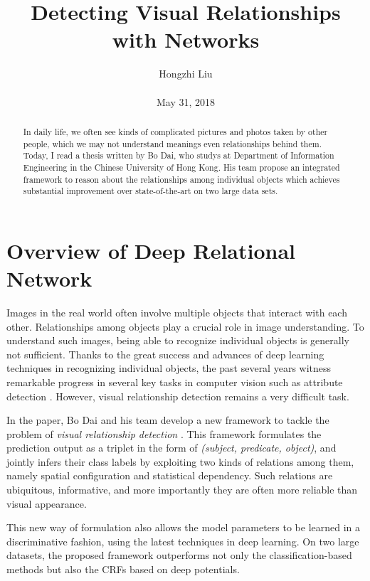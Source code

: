 \documentclass[10pt,twocolumn,letterpaper]{article}
\title{Detecting Visual Relationships with Networks}
\author{Hongzhi Liu\\\\
May 31, 2018}
\begin{document}
\maketitle
\begin{abstract}
	In daily life, we often see kinds of complicated pictures and photos taken by other people, which we may not understand meanings even relationships behind them. Today, I read a thesis written by Bo Dai, who studys at Department of Information Engineering in the Chinese University of Hong Kong. His team propose an integrated framework to reason about the relationships among individual objects which achieves substantial improvement over state-of-the-art on two large data sets.

\end{abstract}
\section{Overview of Deep Relational Network}

Images in the real world often involve multiple objects that interact with each other. Relationships among objects play a crucial role in image understanding. To understand such images, being able to recognize individual objects is generally not sufficient. Thanks to the great success and advances of deep learning techniques in recognizing individual objects, the past several years witness remarkable progress in several key tasks in computer vision such as attribute detection \cite{6909608}. However, visual relationship detection remains a very difficult task.

In the paper, Bo Dai and his team develop a new framework to tackle the problem of \emph{visual relationship detection} \cite{8099835}. This framework formulates the prediction output as a triplet in the form of \emph{(subject, predicate, object)}, and jointly infers their class labels by exploiting two kinds of relations among them, namely spatial configuration and statistical dependency. Such relations are ubiquitous, informative, and more importantly they are often more reliable than visual appearance. 

This new way of formulation also allows the model parameters to be learned in a discriminative fashion, using the latest techniques in deep learning. On two large datasets, the proposed framework outperforms not only the classification-based methods but also the CRFs based on deep potentials.
\end{document}
